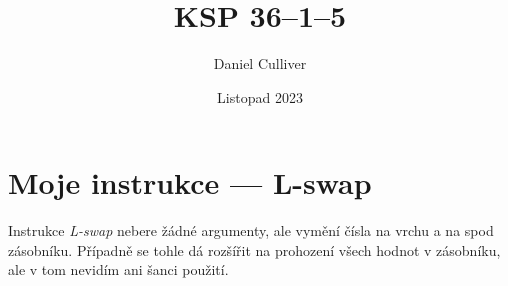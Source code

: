 \documentclass{../../../ksp}
\title{KSP 36--1--5}
\author{Daniel Culliver}
\date{Listopad 2023}
\begin{document}
\maketitle

\section*{Moje instrukce --- L-swap}

Instrukce \emph{L-swap} nebere žádné argumenty, ale vymění čísla na vrchu a na spod zásobníku.
Případně se tohle dá rozšířit na prohození všech hodnot v zásobníku, ale v tom nevidím ani šanci použití.
\end{document}
